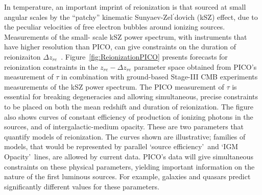 \documentclass[PICOReport.tex]{subfiles}
\begin{document}
In temperature, an important imprint of reionization is that sourced at small angular scales by the ``patchy'' kinematic Sunyaev-Zel$^{\prime}$dovich (kSZ) effect, due to the peculiar velocities of free electron bubbles around ionizing sources.  Measurements of the small- scale kSZ power spectrum, with instruments that have higher resolution than PICO, can give constraints on the duration of reionizaiton $\Delta z_{re}$~\citep{Calabrese2014}.
Figure~\ref{fig:ReionizationPICO} presents forecasts for reionization constraints in the $z_{re} - \Delta z_{re}$ parameter space obtained from PICO's measurement of $\tau$ in combination with ground-based Stage-III CMB experiments measurements of the kSZ power spectrum. The PICO measurement of $\tau$ is essential for breaking degeneracies and allowing simultaneous, precise constraints to be placed on both the mean redshift and duration of reionization. The figure also shows curves of constant efficiency of production of ionizing photons in the sources, and of intergalactic-medium opacity. These are two parameters that quantify models of reionization. The curves shown are illustrative; families of models, that would be represented by parallel \lq source efficiency\rq~and \lq IGM Opacity\rq~lines, are allowed by current data. PICO's data will give simultaneous constraints on these physical parameters, yielding important information on the nature of the first luminous sources. For example, galaxies and quasars predict significantly different values for these parameters.  

\end{document}
